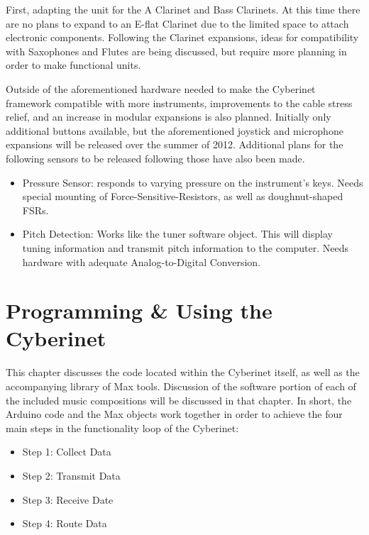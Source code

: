 First, adapting the unit for the A Clarinet and Bass Clarinets. At this time there are no plans to expand to an E-flat Clarinet due to the limited space to attach electronic components. Following the Clarinet expansions, ideas for compatibility with Saxophones and Flutes are being discussed, but require more planning in order to make functional units.

Outside of the aforementioned hardware needed to make the Cyberinet framework compatible with more instruments, improvements to the cable stress relief, and an increase in modular expansions is also planned. Initially only additional buttons available, but the aforementioned joystick and microphone expansions will be released over the summer of 2012. Additional plans for the following sensors to be released following those have also been made.

\begin{itemize}
    \item Pressure Sensor: responds to varying pressure on the instrument's keys. Needs special mounting of Force-Sensitive-Resistors, as well as doughnut-shaped FSRs.
    \item Pitch Detection: Works like the tuner software object. This will display tuning information and transmit pitch information to the computer. Needs hardware with adequate Analog-to-Digital Conversion.
\end{itemize}


\chapter{Programming \& Using the Cyberinet}
This chapter discusses the code located within the Cyberinet itself, as well as the accompanying library of Max tools. Discussion of the software portion of each of the included music compositions will be discussed in that chapter. In short, the Arduino code and the Max objects work together in order to achieve the four main steps in the functionality loop of the Cyberinet:

\begin{itemize}
    \item Step 1: Collect Data
    \item Step 2: Transmit Data
    \item Step 3: Receive Date
    \item Step 4: Route Data
\end{itemize}


